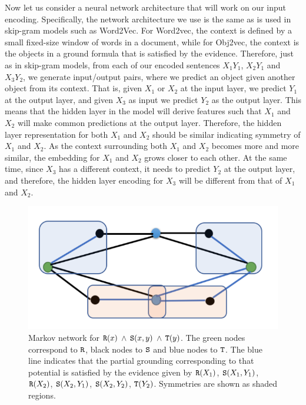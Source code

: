 Now let us consider a neural network architecture that will work on our input encoding. Specifically, the network architecture we use is the same as is used in skip-gram models such as Word2Vec. For Word2vec, the context is defined by a small fixed-size window of words in a document, while for Obj2vec, the context is the objects in a ground formula that is satisfied by the evidence. Therefore, just as in skip-gram models, from each of our encoded sentences $X_1Y_1$, $X_2Y_1$ and $X_3Y_2$, we generate input/output pairs, where we predict an object given another object from its context. That is, given $X_1$ or $X_2$ at the input layer, we predict $Y_1$ at the output layer, and given $X_3$ as input we predict $Y_2$ as the output layer. This means that the hidden layer in the model will derive features such that $X_1$ and $X_2$ will make common predictions at the output layer. Therefore, the hidden layer representation for both $X_1$ and $X_2$ should be similar indicating symmetry of $X_1$ and $X_2$. As the context surrounding both $X_1$ and $X_2$ becomes more and more similar, the embedding for $X_1$ and $X_2$ grows closer to each other.  At the same time, since $X_3$ has a different context, it needs to predict $Y_2$ at the output layer, and therefore, the hidden layer encoding for $X_3$ will be different from that of $X_1$ and $X_2$. 

\begin{figure} 
\centering
 \includegraphics[scale=0.65]{ex2.pdf}
 \caption{\label{fig:ex2}Markov network for ${\tt R}(x)$ $\wedge$ ${\tt S}(x,y)$ $\wedge$ ${\tt T}(y)$. The green nodes correspond to ${\tt R}$, black nodes to ${\tt S}$ and blue nodes to ${\tt T}$. The blue line indicates that the partial grounding corresponding to that potential is satisfied by the evidence given by ${\tt R}(X_1)$, ${\tt S}(X_1,Y_1)$, ${\tt R}(X_2)$, ${\tt S}(X_2,Y_1)$, ${\tt S}(X_2,Y_2)$, ${\tt T}(Y_2)$. Symmetries are shown as shaded regions.}
 \end{figure}

